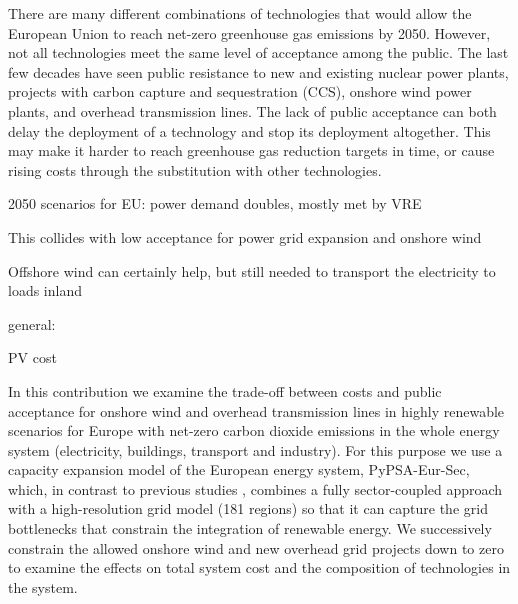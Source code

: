 There are many different combinations of technologies that would allow
the European Union to reach net-zero greenhouse gas emissions by
2050. However, not all technologies meet the same level of acceptance
among the public. The last few decades have seen public resistance to
new and existing nuclear power plants, projects with carbon capture
and sequestration (CCS), onshore wind power plants, and overhead
transmission lines. The lack of public acceptance can both delay the
deployment of a technology and stop its deployment altogether. This
may make it harder to reach greenhouse gas reduction targets in time,
or cause rising costs through the substitution with other
technologies.

2050 scenarios for EU: power demand doubles, mostly met by VRE

This collides with low acceptance for power grid expansion and onshore wind

Offshore wind can certainly help, but still needed to transport the electricity to loads inland

general:
\cite{
    mckennaScenicnessAssessment2021,
    krummModellingSocial2022,
    weinandImpactPublic2021,
    weinandExploringTrilemma,
    trondleTradeOffsGeographic2020,
    sasseDistributionalTradeoffs2019,
    sasseRegionalImpacts2020,
    ludererImpactDeclining2021,
    EuropeanHydrogen,
    victoria2020,
    victoriaSpeedTechnological2021,
    lombardiPolicyDecision2020,
    tsiropoulosNetzeroEmissions2020,
    europeancommission.directorategeneralforenergy.METISStudy2021,
    deutschNoRegretHydrogen,
    tafarteQuantifyingTrade,
    lehmannManagingSpatial}

PV cost
\cite{jaxa-rozenSourcesUncertainty2021,victoriaSolarPhotovoltaics2021,xiaoPlummetingCosts2021}

In this contribution we examine the trade-off between costs and public
acceptance for onshore wind and overhead transmission lines in highly
renewable scenarios for Europe with net-zero carbon dioxide emissions
in the whole energy system (electricity, buildings, transport and
industry). For this purpose we use a capacity expansion model of the
European energy system, PyPSA-Eur-Sec, which, in contrast to previous
studies \cite{henningComprehensiveModel2014,mathiesenSmartEnergy2015,IEESWV,connollySmartEnergy2016,lofflerDesigningModel2017,blancoPotentialHydrogen2018,brownSynergiesSector2018,in-depth_2018,victoria2020},
combines a fully sector-coupled approach with a high-resolution grid
model (181 regions) so that it can capture the grid bottlenecks that
constrain the integration of renewable energy.  We successively
constrain the allowed onshore wind and new overhead grid projects down
to zero to examine the effects on total system cost and the
composition of technologies in the system.

